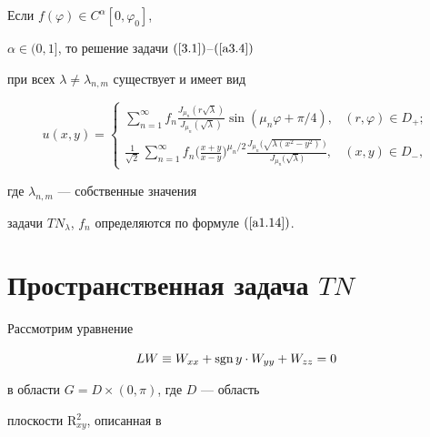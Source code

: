 \begin{thm}


Если $f(\varphi)\in {C}^\alpha[0,\varphi_0]$,


$\alpha\in(0,1]$, то решение задачи $(\ref{3.1})$--$(\ref{a3.4})$ 


при всех $\lambda\ne\lambda_{n,m}$ существует и имеет вид


$$


u(x,y)=


\begin{cases}


\sum\limits_{n=1}^\infty f_n\frac{J_{\mu_n}(r\sqrt \lambda)}{J_{\mu_n}


(\sqrt\lambda)}\sin\left(\mu_n\varphi+\pi/4\right),


& (r,\varphi)\in D_+;\\


{\frac{1}{\sqrt2}}\,


\sum\limits_{n=1}^\infty f_n\big(\frac{x+y}{x-y}\big)^{\mu_n/2}


\frac{J_{\mu_n}\big(\sqrt{\lambda(x^2-y^2)}\,\big)}{J_{\mu_n}


\big(\sqrt\lambda\big)}, & (x,y)\in D_-,


\end{cases}


$$


где $\lambda_{n,m}$ --- собственные значения 


задачи $TN_\lambda$, $f_n$ определяются по формуле $(\ref{a1.14})$.


\end{thm}








\section{Пространственная задача $TN$}





Рассмотрим уравнение


\begin{equation}


LW\equiv W_{xx}+\sgn y\cdot W_{yy}+W_{zz}=0\label{4.1}


\end{equation}


в области $G=D\times(0,\pi)$, где $D$ --- область 


плоскости ${\mathrm R}_{xy}^2$, описанная в


